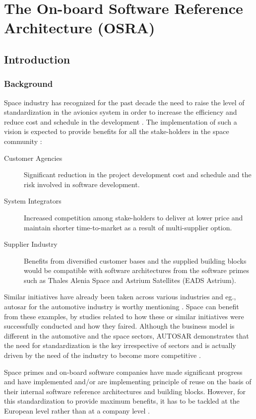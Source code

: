 
\chapter{The On-board Software Reference Architecture (OSRA)}
\label{chap:OSRA}
\section{Introduction}
\subsection{Background}
Space industry has recognized for the past decade the need to raise the level of standardization in the avionics system in order to increase the efficiency and reduce cost and schedule in the development \cite{SAVOIR}.
The implementation of such a vision is expected to provide benefits for all the stake-holders in the space community \cite{SAVOIR}:

\begin{description}
\item  [Customer Agencies] Significant reduction in the project development cost and schedule and the risk involved in software development.
\item [System Integrators] Increased competition among stake-holders to deliver at lower price and maintain shorter time-to-market as a result of multi-supplier option.
\item [Supplier Industry] Benefits from diversified customer bases and the supplied building blocks would be compatible with software architectures from the software primes such as Thales Alenia Space and Astrium Satellites (EADS Astrium).
\end{description}

Similar initiatives have already been taken across various industries and eg., \ac{autosar} for the automotive industry is worthy mentioning \cite{BasConAUTOSAR}. Space can benefit from these examples, by studies related to how these or similar initiatives were successfully conducted and how they faired. Although the business model is different in the automotive and the space sectors, AUTOSAR demonstrates that the need for standardization is the key irrespective of sectors and is actually driven by the need of the industry to become more competitive \cite{EfAnAUTOSAR}.

Space primes and on-board software companies have made significant progress and have implemented and/or are implementing principle of reuse on the basis of their internal software reference architectures and building blocks. However, for this standardization to provide maximum benefits, it has to be tackled at the European level rather than at a company level \cite{SAVOIR}.


